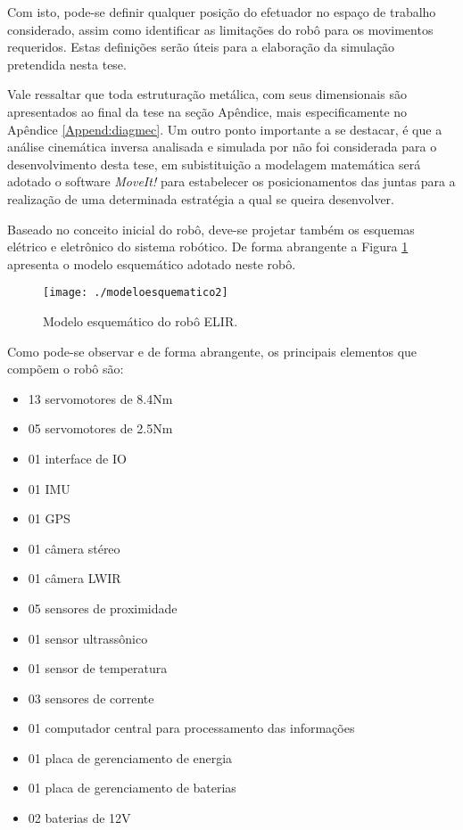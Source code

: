 Com isto, pode-se definir qualquer posição do efetuador no espaço de trabalho considerado, assim como identificar as limitações do robô para os movimentos requeridos. Estas definições serão úteis para a elaboração da simulação pretendida nesta tese.

Vale ressaltar que toda estruturação metálica, com seus dimensionais são apresentados ao final da tese na seção Apêndice, mais especificamente no Apêndice \ref{Append:diagmec}. Um outro ponto importante a se destacar, é que a análise cinemática inversa analisada e simulada por  não foi considerada para o desenvolvimento desta tese, em subistituição a modelagem matemática será adotado o software \textit{MoveIt!} para estabelecer os posicionamentos das juntas para a realização de uma determinada estratégia a qual se queira desenvolver.

Baseado no conceito inicial do robô, deve-se projetar também os esquemas elétrico e eletrônico do sistema robótico. De forma abrangente a Figura \ref{img:elirmodesq} apresenta o modelo esquemático adotado neste robô.

\begin{figure} [h!]	
	\caption{Modelo esquemático do robô ELIR.}
	\label{img:elirmodesq}											 
	\centering													 
	\texttt{[image: ./modeloesquematico2]}
\end{figure}													 

Como pode-se observar e de forma abrangente, os principais elementos que compõem o robô são:

\begin{itemize}
	\item 13 servomotores de 8.4Nm
	\item 05 servomotores de 2.5Nm
	\item 01 interface de IO
	\item 01 IMU
	\item 01 GPS
	\item 01 câmera stéreo
	\item 01 câmera LWIR
	\item 05 sensores de proximidade
	\item 01 sensor ultrassônico
	\item 01 sensor de temperatura
	\item 03 sensores de corrente
	\item 01 computador central para processamento das informações
	\item 01 placa de gerenciamento de energia
	\item 01 placa de gerenciamento de baterias
	\item 02 baterias de 12V
\end{itemize}

